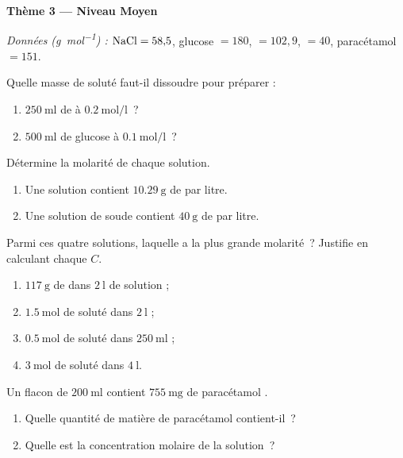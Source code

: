 \documentclass[11pt,a4paper]{article}
\begin{document}
\begin{center}{\large\bfseries\color{primarydark} Thème 3 — Niveau Moyen}\end{center}
\emph{Données (\si{\gram\per\mole}) :} $\ce{NaCl}=58{,}5$, glucose $=180$,
$=102{,}9$, $=40$, paracétamol $=151$.

\begin{exo}
Quelle masse de soluté faut-il dissoudre pour préparer :
\begin{enumerate}[label=\alph*)]
  \item $\SI{250}{\milli\litre}$ de  à $\SI{0.2}{\mole\per\litre}$~?
  \item $\SI{500}{\milli\litre}$ de glucose à $\SI{0.1}{\mole\per\litre}$~?
\end{enumerate}
\end{exo}

\begin{exo}
Détermine la molarité de chaque solution.
\begin{enumerate}[label=\alph*)]
  \item Une solution contient $\SI{10.29}{\gram}$ de  par litre.
  \item Une solution de soude contient $\SI{40}{\gram}$ de  par litre.
\end{enumerate}
\end{exo}

\begin{exo}
Parmi ces quatre solutions, laquelle a la plus grande molarité~? Justifie en calculant chaque $C$.
\begin{enumerate}[label=\alph*)]
  \item $\SI{117}{\gram}$ de  dans $\SI{2}{\litre}$ de solution ;
  \item $\SI{1.5}{\mole}$ de soluté dans $\SI{2}{\litre}$ ;
  \item $\SI{0.5}{\mole}$ de soluté dans $\SI{250}{\milli\litre}$ ;
  \item $\SI{3}{\mole}$ de soluté dans $\SI{4}{\litre}$.
\end{enumerate}
\end{exo}

\begin{exo}
Un flacon de $\SI{200}{\milli\litre}$ contient $\SI{755}{\milli\gram}$ de paracétamol
.
\begin{enumerate}[label=\alph*)]
  \item Quelle quantité de matière de paracétamol contient-il~?
  \item Quelle est la concentration molaire de la solution~?
\end{enumerate}
\end{exo}
\end{document}
